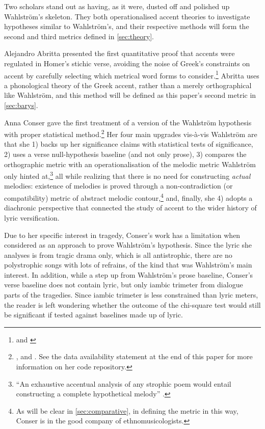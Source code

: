 \documentclass[twoside]{article}
\begin{document}
Two scholars stand out as having, as it were, dusted off and polished up Wahlström's skeleton. They both operationalised accent theories to investigate hypotheses similar to Wahlström's, and their respective methods will form the second and third metrics defined in \autoref{sec:theory}.

Alejandro Abritta presented the first quantitative proof that accents were regulated in Homer’s stichic verse, avoiding the noise of Greek’s constraints on accent by carefully selecting which metrical word forms to consider.\footnote{\textcite*{abrittaRoleAccentAncient2015} and \textcite*{abrittaRoleAccentAncient2018}}
Abritta uses a phonological theory of the Greek accent, rather than a merely orthographical like Wahlström, and this method will be defined as this paper's second metric in \autoref{sec:barys}.

Anna Conser gave the first treatment of a version of the Wahlström hypothesis with proper statistical method.\footnote{\textcite{conserPitchAccentMelody2020}, \textcite{conserMusicalDesignGreek2021} and \textcite{conserAiolaNuxMusical2024}. See the data availability statement at the end of this paper for more information on her code repository.} Her four main upgrades vis-à-vis Wahlström are that she 1) backs up her significance claims with statistical tests of significance, 2) uses a verse null-hypothesis baseline (and not only prose), 3) compares the orthographic metric with an operationalisation of the melodic metric Wahlström only hinted at,\footnote{``An exhaustive accentual analysis of any strophic poem would entail constructing a complete hypothetical melody'' \parencite[11]{wahlstromAccentualResponsionGreek1970}.} all while realizing that there is no need for constructing \textit{actual} melodies: existence of melodies is proved through a non-contradiction (or compatibility) metric of abstract melodic contour,\footnote{As will be clear in \autoref{sec:comparative}, in defining the metric in this way, Conser is in the good company of ethnomusicologists.} and, finally, she 4) adopts a diachronic perspective that connected the study of accent to the wider history of lyric versification.

Due to her specific interest in tragedy, Conser's work has a limitation when considered as an approach to prove Wahlström's hypothesis. Since the lyric she analyses is from tragic drama only, which is all antistrophic, there are no polystrophic songs with lots of refrains, of the kind that was Wahlström’s main interest. In addition, while a step up from Wahlström's prose baseline, Conser's verse baseline does not contain lyric, but  only iambic trimeter from dialogue parts of the tragedies. Since iambic trimeter is less constrained than lyric meters, the reader is left wondering whether the outcome of the chi-square test would still be significant if tested against baselines made up of lyric. 
\end{document}
